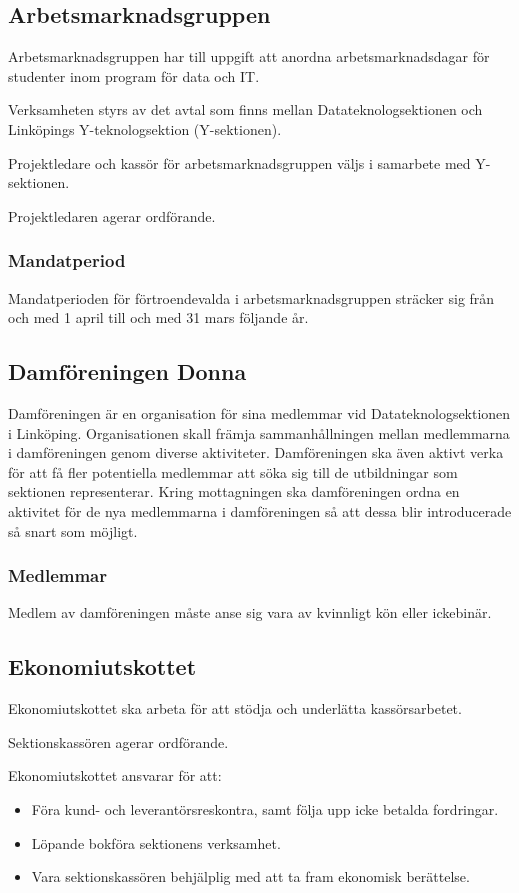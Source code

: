 \documentclass{datateknologsektionen-document}
\begin{document}
\subsection{Arbetsmarknadsgruppen}
\label{arbetsmarknadsgruppen}
Arbetsmarknadsgruppen har till uppgift att anordna arbetsmarknadsdagar för studenter
inom program för data och IT.

Verksamheten styrs av det avtal som finns mellan Datateknologsektionen och Linköpings
Y-teknologsektion (Y-sektionen).

Projektledare och kassör för arbetsmarknadsgruppen väljs i samarbete med Y-sektionen.

Projektledaren agerar ordförande.

\subsubsection{Mandatperiod}
Mandatperioden för förtroendevalda i arbetsmarknadsgruppen sträcker sig från och med 1 april till och med 31 mars följande år.

\subsection{Damföreningen Donna}
Damföreningen är en organisation för sina medlemmar vid Datateknologsektionen i Linköping.
Organisationen skall främja sammanhållningen mellan medlemmarna i damföreningen genom
diverse aktiviteter. Damföreningen ska även aktivt verka för att få fler potentiella
medlemmar att söka sig till de utbildningar som sektionen representerar. Kring
mottagningen ska damföreningen ordna en aktivitet för de nya medlemmarna i damföreningen
så att dessa blir introducerade så snart som möjligt.

\subsubsection{Medlemmar}
Medlem av damföreningen måste anse sig vara av kvinnligt kön eller ickebinär.

\subsection{Ekonomiutskottet}
Ekonomiutskottet ska arbeta för att stödja och underlätta kassörsarbetet.

Sektionskassören agerar ordförande.

Ekonomiutskottet ansvarar för att:

\begin{itemize}
    \item Föra kund- och leverantörsreskontra, samt följa upp icke betalda fordringar.
    \item Löpande bokföra sektionens verksamhet.
    \item Vara sektionskassören behjälplig med att ta fram ekonomisk berättelse.
\end{itemize}
\end{document}

